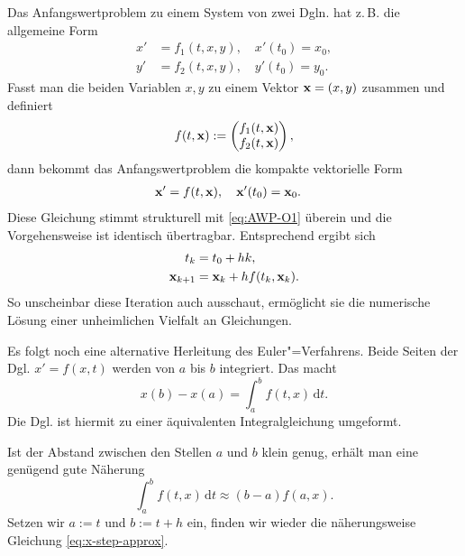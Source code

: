 Das Anfangswertproblem zu einem System von zwei Dgln. hat
z.\,B. die allgemeine Form
\[\begin{split}
x' &= f_1(t,x,y),\quad x'(t_0)=x_0,\\
y' &= f_2(t,x,y),\quad y'(t_0)=y_0.
\end{split}\]
Fasst man die beiden Variablen $x,y$ zu einem Vektor
$\mathbf{x} = (x,y)$ zusammen und definiert
\[
f(t,\mathbf{x}) := \begin{pmatrix}
f_1(t,\mathbf{x})\\
f_2(t,\mathbf{x})
\end{pmatrix},
\]
dann bekommt das Anfangswertproblem die kompakte
vektorielle Form
\[\begin{split}
\mathbf{x}' &= f(t,\mathbf{x}),\quad \mathbf{x}'(t_0)=\mathbf{x}_0.
\end{split}\]
Diese Gleichung stimmt strukturell mit \eqref{eq:AWP-O1} überein
und die Vorgehensweise ist identisch übertragbar. Entsprechend ergibt
sich
\begin{align*}
t_{k} &= t_0+hk,\\
\mathbf{x}_{k+1} &= \mathbf{x}_k+hf(t_k,\mathbf{x}_k).
\end{align*}
So unscheinbar diese Iteration auch ausschaut, ermöglicht sie die
numerische Lösung einer unheimlichen Vielfalt an Gleichungen.

Es folgt noch eine alternative Herleitung des Euler"=Verfahrens. Beide
Seiten der Dgl. $x'=f(x,t)$ werden
von $a$ bis $b$ integriert. Das macht%
\[x(b)-x(a) = \int_a^b f(t,x)\,\mathrm dt.\]
Die Dgl. ist hiermit zu einer äquivalenten Integralgleichung umgeformt.

Ist der Abstand zwischen den Stellen $a$ und $b$ klein genug, erhält
man eine genügend gute Näherung%
\[\int_a^b f(t,x)\,\mathrm dt \approx (b-a)f(a,x).\]
Setzen wir $a:=t$ und $b:=t+h$ ein, finden wir
wieder die näherungsweise Gleichung \eqref{eq:x-step-approx}.


